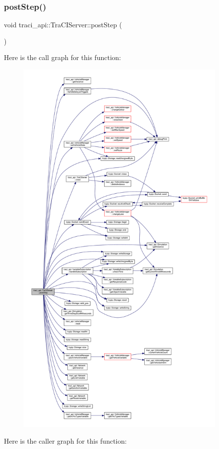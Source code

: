 \subsubsection{\texorpdfstring{post\+Step()}{postStep()}}
{\footnotesize\ttfamily void traci\+\_\+api\+::\+Tra\+C\+I\+Server\+::post\+Step (\begin{DoxyParamCaption}{ }\end{DoxyParamCaption})}

Here is the call graph for this function\+:
\nopagebreak
\begin{figure}[H]
\begin{center}
\leavevmode
\includegraphics[height=550pt]{classtraci__api_1_1_tra_c_i_server_af4814a9a99d79f4e00fc102169d10cc2_cgraph}
\end{center}
\end{figure}
Here is the caller graph for this function\+:
